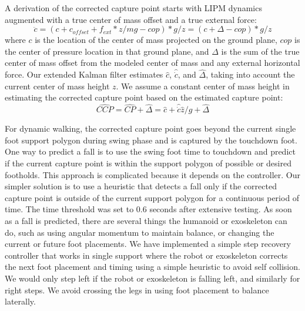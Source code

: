 \documentclass[letterpaper,12pt,fullpage]{article}
\begin{document}
A derivation of the corrected capture point starts with LIPM dynamics
augmented with a true center of mass offset and a true external force:
\begin{equation}
\ddot{c} = (c + c_{offset} + f_{ext}*z/mg - cop)*g/z
= (c + \Delta - cop)*g/z
\end{equation}
where $c$ is the location of the center of mass projected on the ground
plane,
$cop$ is the center of pressure
location in that ground plane, and $\Delta$ is the sum of the true center of mass
offset from the modeled center of mass and any external horizontal force.
Our extended Kalman filter estimates $\hat{c}$, $\hat{\dot{c}}$, and
$\hat{\Delta}$,
taking into account the
current center of mass height $z$. We assume a constant center of mass height
in estimating the corrected capture point based on the estimated capture point:
\begin{equation}
\widehat{CCP} = \widehat{CP} + \hat{\Delta} 
= \hat{c} + \hat{\dot{c}}\hat{z}/g + \hat{\Delta}
\end{equation}

For dynamic walking, the corrected capture point goes beyond the
current single foot support polygon during swing phase and is captured by
the touchdown foot. One way to predict a fall is to use the
swing foot time to touchdown and predict if the current
capture point is within the support polygon of possible or desired
footholds. This approach is complicated because it depends
on the controller. Our simpler solution is to use a heuristic
that detects a fall only if the corrected capture point
is outside of the current support
polygon for a continuous period of time. The time threshold was set to
0.6 seconds after extensive testing. As soon as a fall is
predicted, there are several things the humanoid or exoskeleton can do, such
as using angular momentum to maintain balance, or changing the
current or future foot placements.
We have implemented a simple
step recovery controller that works in single support where
the robot or exoskeleton corrects the next foot placement and timing
using a simple heuristic to avoid self collision.
We would only step left if the robot or exoskeleton is falling left, and similarly
for right steps. We avoid crossing the legs in using foot placement
to balance laterally.
\end{document}
